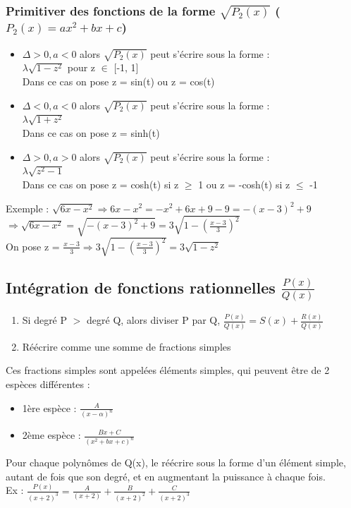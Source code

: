 \documentclass{article}
\begin{document}
\subsubsection{Primitiver des fonctions de la forme $\sqrt{P_2(x)}$ ($P_2(x) = ax^2 + bx + c$)}
\begin{itemize}
    \item $\Delta > 0, a < 0$ alors $\sqrt{P_2(x)}$ peut s'écrire sous la forme :\\
    $\lambda \sqrt{1 - z^2}$ pour z $\in $ [-1, 1]\\
    Dans ce cas on pose z = sin(t) ou z = cos(t)
    \item $\Delta < 0, a < 0$ alors $\sqrt{P_2(x)}$ peut s'écrire sous la forme :\\
    $\lambda \sqrt{1 + z^2}$\\
    Dans ce cas on pose z = sinh(t)
    \item $\Delta > 0, a > 0$ alors $\sqrt{P_2(x)}$ peut s'écrire sous la forme :\\
    $\lambda \sqrt{z^2 - 1}$\\
    Dans ce cas on pose z = cosh(t) si z $\geq$ 1 ou z = -cosh(t) si z $\leq$ -1
\end{itemize}
Exemple : $\sqrt{6x - x^2} \Rightarrow 6x - x^2 = -x^2 + 6x + 9 - 9 = -(x - 3)^2 + 9$\\
$\Rightarrow \sqrt{6x - x^2} = \sqrt{-(x - 3)^2 + 9} = 3\sqrt{1 - (\frac{x-3}{3})^2}$\\
On pose z = $\frac{x-3}{3} \Rightarrow 3\sqrt{1 - (\frac{x-3}{3})^2} = 3\sqrt{1 - z^2}$ 

\subsection{Intégration de fonctions rationnelles $\frac{P(x)}{Q(x)}$}
\begin{enumerate}
    \item Si degré P $>$ degré Q, alors diviser P par Q, $\frac{P(x)}{Q(x)} = S(x) + \frac{R(x)}{Q(x)}$
    \item Réécrire comme une somme de fractions simples
\end{enumerate}
Ces fractions simples sont appelées éléments simples, qui peuvent être de 2 espèces différentes :
\begin{itemize}
    \item 1ère espèce : $\frac{A}{(x-\alpha)^n}$
    \item 2ème espèce : $\frac{Bx + C}{(x^2 + bx + c)^n}$
\end{itemize}
Pour chaque polynômes de Q(x), le réécrire sous la forme d'un élément simple, autant de fois que son degré, et en augmentant la puissance à chaque fois.\\ Ex : $\frac{P(x)}{(x+2)^3} = \frac{A}{(x+2)} + \frac{B}{(x+2)^2} + \frac{C}{(x+2)^3}$ 
\end{document}
